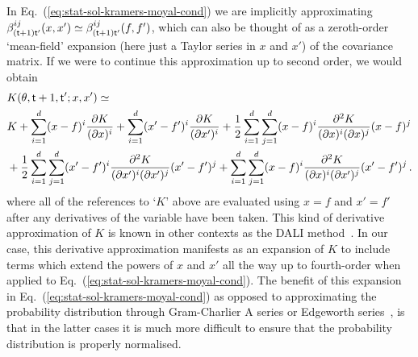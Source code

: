 In Eq.~(\ref{eq:stat-sol-kramers-moyal-cond}) we are implicitly approximating $\beta^{ij}_{({\sf t}+1){\sf t}'}(x,x') \simeq \beta^{ij}_{({\sf t}+1){\sf t}'}(f,f')$, which can also be thought of as a zeroth-order `mean-field' expansion (here just a Taylor series in $x$ and $x'$) of the covariance matrix. If we were to continue this approximation up to second order, we would obtain 
\begin{align}
& K(\theta , {\sf t}+1, {\sf t}'; x,x') \simeq \nonumber \\
& K + \sum_{i=1}^d(x-f)^i\frac{\partial K}{(\partial x)^i} + \sum_{i=1}^d(x'-f')^i\frac{\partial K}{(\partial x')^i} + \frac{1}{2}\sum_{i=1}^d\sum_{j=1}^d (x-f)^i\frac{\partial^2 K}{(\partial x)^i(\partial x)^j}(x-f)^j \nonumber \\
&+ \frac{1}{2}\sum_{i=1}^d\sum_{j=1}^d (x'-f')^i\frac{\partial^2 K}{(\partial x')^i(\partial x')^j}(x'-f')^j + \sum_{i=1}^d\sum_{j=1}^d (x-f)^i\frac{\partial^2 K}{(\partial x)^i(\partial x')^j}(x'-f')^j \label{eq:dali-covariance}\,.
\end{align}
where all of the references to `$K$' above are evaluated using $x=f$ and $x'=f'$ after any derivatives of the variable have been taken. This kind of derivative approximation of $K$ is known in other contexts as the DALI method~\cite{sellentin2014breaking, dali}. In our case, this derivative approximation manifests as an expansion of $K$ to include terms which extend the powers of $x$ and $x'$ all the way up to fourth-order when applied to Eq.~(\ref{eq:stat-sol-kramers-moyal-cond}). The benefit of this expansion in Eq.~(\ref{eq:stat-sol-kramers-moyal-cond}) as opposed to approximating the probability distribution through Gram-Charlier A series or Edgeworth series~\cite{kolassa2006series}, is that in the latter cases it is much more difficult to ensure that the probability distribution is properly normalised.

